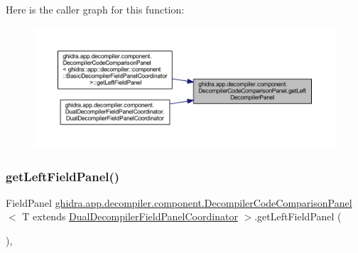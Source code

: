 Here is the caller graph for this function\+:
\nopagebreak
\begin{figure}[H]
\begin{center}
\leavevmode
\includegraphics[width=350pt]{classghidra_1_1app_1_1decompiler_1_1component_1_1_decompiler_code_comparison_panel_ade7f44621303975a5e9ad8b74dee4a2e_icgraph}
\end{center}
\end{figure}
\mbox{\label{classghidra_1_1app_1_1decompiler_1_1component_1_1_decompiler_code_comparison_panel_ac9ef9d76d21e9144f46b162b958589a9}} 
\subsubsection{\texorpdfstring{getLeftFieldPanel()}{getLeftFieldPanel()}}
{\footnotesize\ttfamily Field\+Panel \mbox{\hyperlink{classghidra_1_1app_1_1decompiler_1_1component_1_1_decompiler_code_comparison_panel}{ghidra.\+app.\+decompiler.\+component.\+Decompiler\+Code\+Comparison\+Panel}}$<$ T extends \mbox{\hyperlink{classghidra_1_1app_1_1decompiler_1_1component_1_1_dual_decompiler_field_panel_coordinator}{Dual\+Decompiler\+Field\+Panel\+Coordinator}} $>$.get\+Left\+Field\+Panel (\begin{DoxyParamCaption}{ }\end{DoxyParamCaption})\hspace{0.3cm}{\ttfamily [inline]}, {\ttfamily [protected]}}



